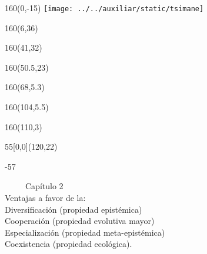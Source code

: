 \documentclass[shownotes,aspectratio=169]{beamer}
\begin{document}
\begin{frame}

\begin{textblock}{160}(0,-15)
\texttt{[image: ../../auxiliar/static/tsimane]}
\end{textblock}


\begin{textblock}{160}(6,36)
\LARGE {}
\end{textblock}
\begin{textblock}{160}(41,32)
\LARGE {}
\end{textblock}
\begin{textblock}{160}(50.5,23)
\LARGE {}
\end{textblock}
\begin{textblock}{160}(68,5.3)
\LARGE {}
\end{textblock}
\begin{textblock}{160}(104,5.5)
\LARGE {}
\end{textblock}
\begin{textblock}{160}(110,3)
\LARGE {}
\end{textblock}


\begin{textblock}{55}[0,0](120,22)
\begin{turn}{-57}
\parbox{7cm}{\sloppy\setlength\parfillskip{0pt}
\textcolor{black!0}{\ \ \ \ \ Capítulo 2} \\
\small\textcolor{black!5}{\hspace{-0.15cm} Ventajas a favor de la:} \\
\small\textcolor{black!5}{\hspace{-1.45cm} Diversificación (propiedad epistémica)}\\
\small\textcolor{black!5}{\hspace{-1.7cm} Cooperación (propiedad evolutiva mayor)}\\
\small\textcolor{black!5}{ \hspace{-1.75cm}Especialización (propiedad meta-epistémica)} \\
\small\textcolor{black!5}{\hspace{-2cm} Coexistencia (propiedad ecológica).\\ }}
\end{turn}
\end{textblock}


\end{frame}
\end{document}

